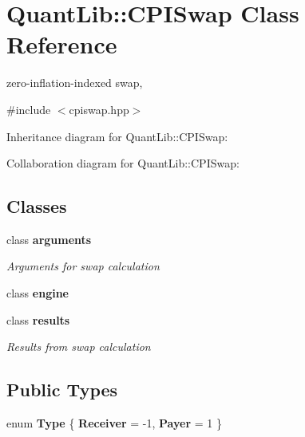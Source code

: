\section{Quant\+Lib\+:\+:C\+P\+I\+Swap Class Reference}
\label{class_quant_lib_1_1_c_p_i_swap}


zero-\/inflation-\/indexed swap,  




{\ttfamily \#include $<$cpiswap.\+hpp$>$}



Inheritance diagram for Quant\+Lib\+:\+:C\+P\+I\+Swap\+:


Collaboration diagram for Quant\+Lib\+:\+:C\+P\+I\+Swap\+:
\subsection*{Classes}
\begin{DoxyCompactItemize}
\item 
class {\bf arguments}
\begin{DoxyCompactList}\small\item\em Arguments for swap calculation \end{DoxyCompactList}\item 
class {\bf engine}
\item 
class {\bf results}
\begin{DoxyCompactList}\small\item\em Results from swap calculation \end{DoxyCompactList}\end{DoxyCompactItemize}
\subsection*{Public Types}
\begin{DoxyCompactItemize}
\item 
enum {\bfseries Type} \{ {\bfseries Receiver} = -\/1, 
{\bfseries Payer} = 1
 \}\label{class_quant_lib_1_1_c_p_i_swap_a6e0c016cbc9c9d6cd535c101578b7a33}

\end{DoxyCompactItemize}

